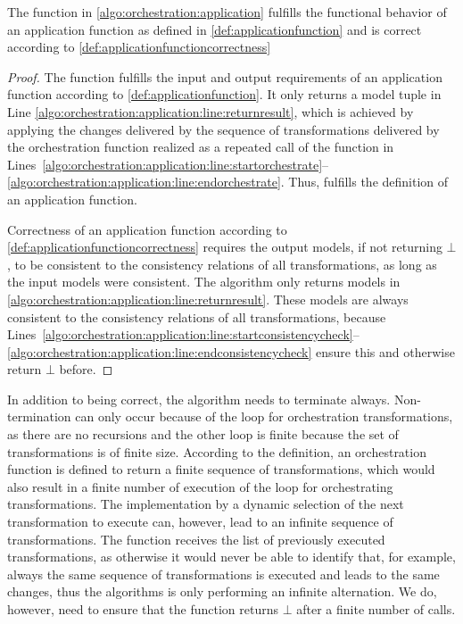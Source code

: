 \begin{theorem}
    The  function in \autoref{algo:orchestration:application} fulfills the functional behavior of an application function as defined in \autoref{def:applicationfunction} and is correct according to \autoref{def:applicationfunctioncorrectness}
\end{theorem}
\begin{proof}
    The  function fulfills the input and output requirements of an application function according to \autoref{def:applicationfunction}.
    It only returns a model tuple in Line \ref{algo:orchestration:application:line:returnresult}, which is achieved by applying the changes delivered by the sequence of transformations delivered by the orchestration function realized as a repeated call of the  function in Lines~\ref{algo:orchestration:application:line:startorchestrate}--\ref{algo:orchestration:application:line:endorchestrate}.
    Thus,  fulfills the definition of an application function.

    Correctness of an application function according to \autoref{def:applicationfunctioncorrectness} requires the output models, if not returning $\bot$, to be consistent to the consistency relations of all transformations, as long as the input models were consistent.
    The algorithm only returns models in \autoref{algo:orchestration:application:line:returnresult}.
    These models are always consistent to the consistency relations of all transformations, because Lines~\ref{algo:orchestration:application:line:startconsistencycheck}--\ref{algo:orchestration:application:line:endconsistencycheck} ensure this and otherwise return $\bot$ before.
\end{proof}

In addition to being correct, the algorithm needs to terminate always.
Non-termination can only occur because of the loop for orchestration transformations, as there are no recursions and the other loop is finite because the set of transformations is of finite size.
According to the definition, an orchestration function is defined to return a finite sequence of transformations, which would also result in a finite number of execution of the loop for orchestrating transformations.
The implementation by a dynamic selection of the next transformation to execute can, however, lead to an infinite sequence of transformations.
The  function receives the list of previously executed transformations, as otherwise it would never be able to identify that, for example, always the same sequence of transformations is executed and leads to the same changes, thus the algorithms is only performing an infinite alternation.
We do, however, need to ensure that the  function returns $\bot$ after a finite number of calls.

